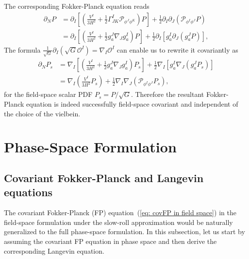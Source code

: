 \documentclass[aps, prd
, preprint
, nofootinbib 
, notitlepage
, longbibliography
]{revtex4-1}
\newcommand{\calO}{\mathcal{O}}
\newcommand{\calP}{\mathcal{P}}
\newcommand{\bae}[1]{\begin{align} #1 \end{align}}
\begin{document}
The corresponding Fokker-Planck equation reads
\bae{
    \partial_NP&=\partial_I\left[\left(\frac{V^I}{3H^2}+\frac{1}{2}\Gamma^I_{JK}\calP_{\phi^J\phi^K}\right)P\right]+\frac{1}{2}\partial_I\partial_J(\calP_{\phi^I\phi^J}P) \nonumber \\
    &=\partial_I\left[\left(\frac{V^I}{3H^2}+\frac{1}{2}g_a^J\nabla_Jg^I_a\right)P\right]+\frac{1}{2}\partial_I\left[g^I_a\partial_J(g^J_aP)\right],
}
The formula $\frac{1}{\sqrt{G}}\partial_I(\sqrt{G}\calO^I)=\nabla_I\calO^I$ can enable us to rewrite it covariantly as
\bae{\label{eq: covFP in field space}
    \partial_NP_s&=\nabla_I\left[\left(\frac{V^I}{3H^2}+\frac{1}{2}g^J_a\nabla_Jg^I_a\right)P_s\right]+\frac{1}{2}\nabla_I\left[g^I_a\nabla_J(g^J_aP_s)\right] \nonumber \\
    &=\nabla_I\left(\frac{V^I}{3H^2}P_s\right)+\frac{1}{2}\nabla_I\nabla_J(\calP_{\phi^I\phi^J}P_s),
}
for the field-space scalar PDF $P_s=P/\sqrt{G}$. Therefore the resultant Fokker-Planck equation is indeed 
successfully field-space covariant and independent of the choice of the vielbein.




\section{Phase-Space Formulation}

\subsection{Covariant Fokker-Planck and Langevin equations}

The covariant Fokker-Planck (FP) equation~(\ref{eq: covFP in field space}) in the field-space formulation under the slow-roll approximation
would be naturally generalized to the full phase-space formulation.
In this subsection, let us start by assuming the covariant FP equation in phase space and then derive the corresponding Langevin equation.
\end{document}
